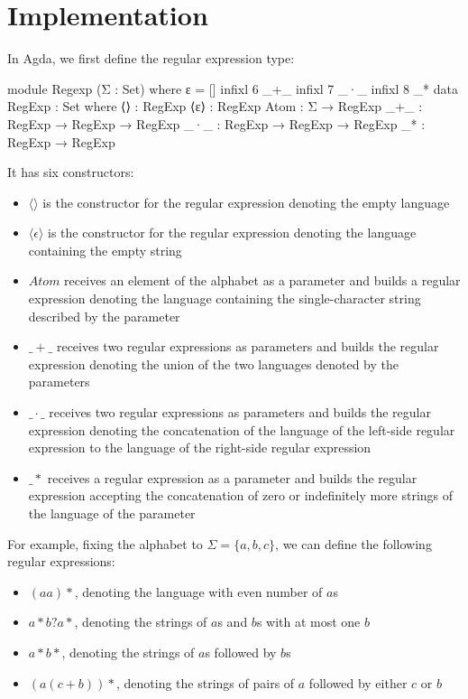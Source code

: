 \section{Implementation}
In Agda, we first define the regular expression type: 
\begin{agda}
module Regexp (Σ : Set) where
ε = []
infixl 6 _+_
infixl 7 _·_
infixl 8 _*
data RegExp : Set where
  ⟨⟩   : RegExp
  ⟨ε⟩   : RegExp
  Atom : Σ → RegExp
  _+_  : RegExp → RegExp → RegExp
  _·_  : RegExp → RegExp → RegExp
  _*   : RegExp → RegExp
\end{agda}
It has six constructors:
\begin{itemize}
    \item $⟨⟩$ is the constructor for the regular expression denoting the empty language
    \item $⟨\epsilon⟩$ is the constructor for the regular expression denoting the language containing the empty string
    \item $Atom$ receives an element of the alphabet as a parameter and builds a regular expression denoting the language containing the single-character string described by the parameter
    \item $\_+\_$ receives two regular expressions as parameters and builds the regular expression denoting the union of the two languages denoted by the parameters
    \item $\_\cdot\_$ receives two regular expressions as parameters and builds the regular expression denoting the concatenation of the language of the left-side regular expression to the language of the right-side regular expression
    \item $\_*$ receives a regular expression as a parameter and builds the regular expression accepting the concatenation of zero or indefinitely more strings of the language of the parameter
\end{itemize}
For example, fixing the alphabet to $\Sigma = \{a, b, c\}$, we can define the following regular expressions:
\begin{itemize}
    \item $(aa)*$, denoting the language with even number of $a$s
    \item $a*b?a*$, denoting the strings of $a$s and $b$s with at most one $b$
    \item $a*b*$, denoting the strings of $a$s followed by $b$s
    \item $(a(c+b))*$, denoting the strings of pairs of $a$ followed by either $c$ or $b$
\end{itemize}
